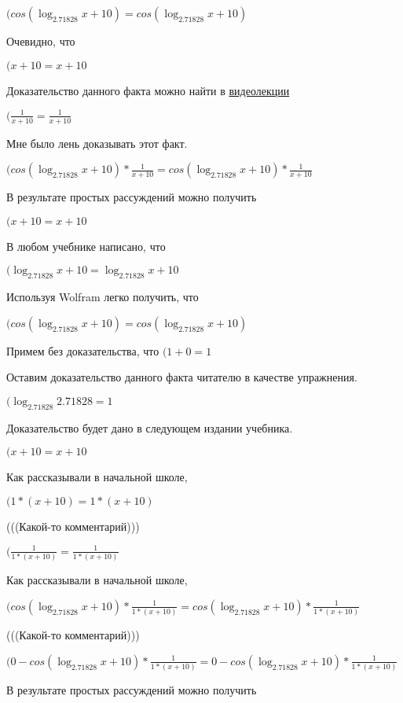 \documentclass[12pt,a4paper,fleqn]{article}
\theoremstyle{definition}
\begin{document}
$(cos(\log_{ 2.71828 }{ x  +  10 }) = cos(\log_{ 2.71828 }{ x  +  10 })$

Очевидно, что

$( x  +  10  =  x  +  10 $

Доказательство данного факта можно найти в \href{https://www.youtube.com/watch?v=dQw4w9WgXcQ}{видеолекции}

$(\frac{ 1 }{ x  +  10 }
 = \frac{ 1 }{ x  +  10 }
$

Мне было лень доказывать этот факт.

$(cos(\log_{ 2.71828 }{ x  +  10 }) * \frac{ 1 }{ x  +  10 }
 = cos(\log_{ 2.71828 }{ x  +  10 }) * \frac{ 1 }{ x  +  10 }
$

В результате простых рассуждений можно получить

$( x  +  10  =  x  +  10 $

В любом учебнике написано, что

$(\log_{ 2.71828 }{ x  +  10 } = \log_{ 2.71828 }{ x  +  10 }$

Используя Wolfram легко получить, что

$(cos(\log_{ 2.71828 }{ x  +  10 }) = cos(\log_{ 2.71828 }{ x  +  10 })$

Примем без доказательства, что
$( 1  +  0  =  1 $

Оставим доказательство данного факта читателю в качестве упражнения.

$(\log_{ 2.71828 }{ 2.71828 } =  1 $

Доказательство будет дано в следующем издании учебника.

$( x  +  10  =  x  +  10 $

Как рассказывали в начальной школе,

$( 1  * ( x  +  10 ) =  1  * ( x  +  10 )$

(((Какой-то комментарий)))

$(\frac{ 1 }{ 1  * ( x  +  10 )}
 = \frac{ 1 }{ 1  * ( x  +  10 )}
$

Как рассказывали в начальной школе,

$(cos(\log_{ 2.71828 }{ x  +  10 }) * \frac{ 1 }{ 1  * ( x  +  10 )}
 = cos(\log_{ 2.71828 }{ x  +  10 }) * \frac{ 1 }{ 1  * ( x  +  10 )}
$

(((Какой-то комментарий)))

$( 0  - cos(\log_{ 2.71828 }{ x  +  10 }) * \frac{ 1 }{ 1  * ( x  +  10 )}
 =  0  - cos(\log_{ 2.71828 }{ x  +  10 }) * \frac{ 1 }{ 1  * ( x  +  10 )}
$

В результате простых рассуждений можно получить
\end{document}

